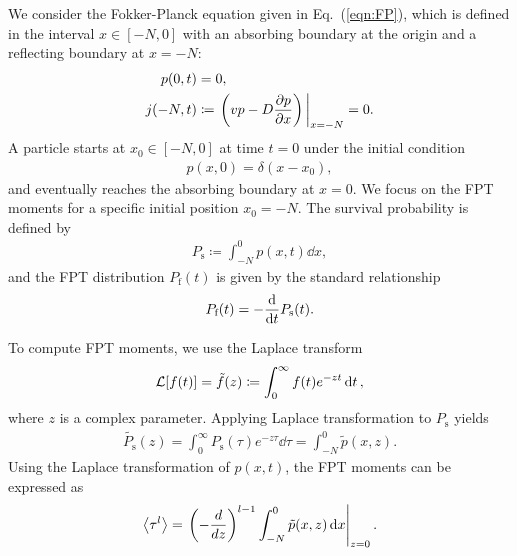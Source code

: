 \documentclass[%
 reprint,
superscriptaddress,
 amsmath,amssymb,
 aps,
 prx,
]{revtex4-2}
\begin{document}
We consider the Fokker-Planck equation given in Eq.~(\ref{eqn:FP}), which is defined in the interval $x\in[-N,0]$ with an absorbing boundary at the origin and a reflecting boundary at $x=-N$: 
\begin{align}
    p(0,t) &= 0, \label{eqn:bc1}\\
    j(-N,t) & \coloneqq \eval{\left(v p - D \pdv{p}{x}\right)}_{x=-N} = 0. \label{eqn:bc2}
\end{align}
A particle starts at $x_0\in[-N, 0]$ at time $t=0$ under the initial condition  
\begin{align}
    p(x,0) = \delta(x-x_0),  
\end{align}
and eventually reaches the absorbing boundary at $x=0$. 
We focus on the FPT moments for a specific initial position $x_0=-N$. 
The survival probability is defined by  
\begin{align}
  P_\text{s} \coloneqq \int_{-N}^0 p(x,t) \dd{x},  
\end{align}
and the FPT distribution $P_\text{f}(t)$ is given by the standard relationship
\begin{align}
    P_\text{f}(t) = -\dv{t} P_\text{s}(t). 
\end{align}

To compute FPT moments, we use the Laplace transform
\begin{gather}
    \mathcal{L} \qty[f(t)] = \tilde{f}(z) \coloneqq \int_0^\infty f(t) e^{-zt} \dd{t},
\end{gather}
where $z$ is a complex parameter. 
Applying Laplace transformation to $P_\text{s}$ yields 
\begin{align}
    \tilde{P_\text{s}}(z) = \int_0^\infty P_\text{s}(\tau) e^{-z\tau}\dd{\tau}=\int_{-N}^0\tilde{p}(x,z).  
\end{align}
Using the Laplace transformation of $p(x,t)$, the FPT moments can be expressed as     
\begin{align}
    \expval{\tau^l} = \left.\left(-\frac{d}{dz}\right)^{l-1}\int_{-N}^0 \tilde{p}(x,z) \dd{x}\right|_{z=0}. 
\end{align}
\end{document}
